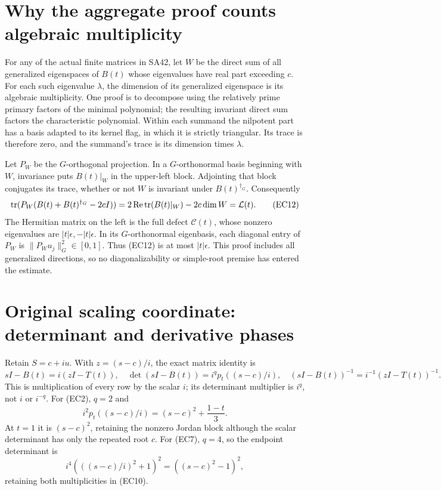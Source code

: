 \section{Why the aggregate proof counts algebraic multiplicity}

For any of the actual finite matrices in SA42, let \(W\)
be the direct sum of all generalized eigenspaces of \(B(t)\)
whose eigenvalues have real part exceeding \(c\).
For each such eigenvalue \(\lambda\), the dimension of its
generalized eigenspace is its algebraic multiplicity.
One proof is to decompose using the relatively prime
primary factors of the minimal polynomial; the resulting
invariant direct sum factors the characteristic polynomial.
Within each summand the nilpotent part has a basis adapted
to its kernel flag, in which it is strictly triangular.
Its trace is therefore zero, and the summand's trace is
its dimension times \(\lambda\).

Let \(P_W\) be the \(G\)-orthogonal projection. In a
\(G\)-orthonormal basis beginning with \(W\), invariance
puts \(B(t)|_W\) in the upper-left block. Adjointing that
block conjugates its trace, whether or not \(W\) is
invariant under \(B(t)^{\dagger_G}\).
Consequently
\begin{equation}
 \operatorname{tr}(P_W(B(t)+B(t)^{\dagger_G}-2cI))
 =2\operatorname{Re}\operatorname{tr}(B(t)|_W)-2c\dim W
 =\mathcal L(t).
 \tag{EC12}
\end{equation}
The Hermitian matrix on the left is the full defect
\(\mathcal C(t)\), whose nonzero eigenvalues are
\(|t|\epsilon,-|t|\epsilon\). In its \(G\)-orthonormal
eigenbasis, each diagonal entry of \(P_W\) is
\(\|P_Wu_j\|_G^2\in[0,1]\). Thus (EC12) is at most
\(|t|\epsilon\). This proof includes all generalized
directions, so no diagonalizability or simple-root premise
has entered the estimate.

\section{Original scaling coordinate: determinant and derivative phases}

Retain \(S=c+iu\). With \(z=(s-c)/i\), the exact matrix identity is
\begin{equation}
 sI-B(t)=i(zI-T(t)),\quad
 \det(sI-B(t))=i^q p_t((s-c)/i),\quad
 (sI-B(t))^{-1}=i^{-1}(zI-T(t))^{-1}.
 \tag{EC13}
\end{equation}
This is multiplication of every row by the scalar \(i\);
its determinant multiplier is \(i^q\), not \(i\) or \(i^{-q}\).
For (EC2), \(q=2\) and
\[
 i^2p_t((s-c)/i)=(s-c)^2+\frac{1-t}{3}.
\]
At \(t=1\) it is \((s-c)^2\), retaining the nonzero
Jordan block although the scalar determinant has only the
repeated root \(c\). For (EC7), \(q=4\), so the endpoint
determinant is
\[
 i^4(( (s-c)/i)^2+1)^2
       =((s-c)^2-1)^2,
\]
retaining both multiplicities in (EC10).

